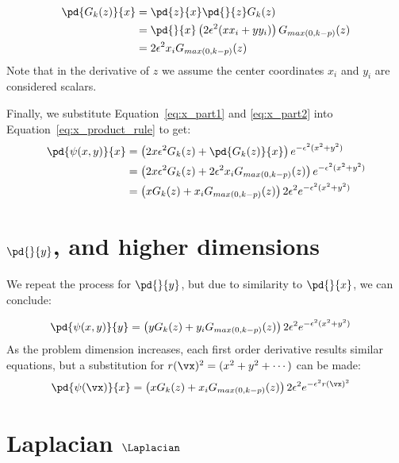\documentclass[11pt]{report}
\begin{document}
{\begin{align}
\pd{G_k(z)}{x} & = \pd{z}{x} \pd{}{z} G_k(z) \nonumber \\
               & = \pd{}{x} \left( 2\epsilon^2(x x_i + y y_i) \right) G_{max(0,k-p)}(z) \nonumber \\ 
               & = 2 \epsilon^2 x_i G_{max(0,k-p)}( z ) \label{eq:x_part2}
\end{align}
Note that in the derivative of $z$ we assume the center coordinates $x_i$ and $y_i$ are considered scalars. 


Finally, we substitute Equation~\ref{eq:x_part1} and \ref{eq:x_part2} into Equation~\ref{eq:x_product_rule} to get:
\begin{align}
\pd{\psi(x,y)}{x} & = \left( 2x\epsilon^2 G_k(z) + \pd{G_k(z)}{x} \right) e^{-\epsilon^2(x^2 + y^2)} \nonumber \\
                 & = \left( 2x\epsilon^2 G_k(z) + 2 \epsilon^2 x_i G_{max(0,k-p)}( z )  \right) e^{-\epsilon^2(x^2 + y^2)}  \nonumber \\
                 & = \left( x G_{k}(z) + x_i G_{max(0,k-p)}(z) \right) 2 \epsilon^2 e^{-\epsilon^2(x^2+y^2)}\label{eq:rbf_ga_xderiv}
\end{align}


\section{$\pd{}{y}$, and higher dimensions}

We repeat the process for $\pd{}{y}$, but due to similarity to $\pd{}{x}$, we can conclude: 

\begin{align}
\pd{\psi(x,y)}{y}   & = \left( y G_k(z) + y_i G_{max(0,k-p)}( z )  \right) 2\epsilon^2 e^{-\epsilon^2(x^2 + y^2)} \label{eq:rbf_ga_yderiv}
\end{align}
As the problem dimension increases, each first order derivative results similar equations, but a substitution for $r(\vx)^2 = (x^2 + y^2 + \cdots)$ can be made: 
\begin{align}
\pd{\psi(\vx)}{x}   & = \left( x G_k(z) + x_i G_{max(0,k-p)}( z )  \right) 2\epsilon^2 e^{-\epsilon^2 r(\vx)^2} \label{eq:rbf_ga_yderiv}
\end{align}


\section{Laplacian $\Laplacian$}

}
\end{document}
